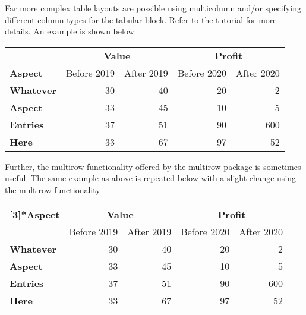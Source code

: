 Far more complex table layouts are possible using {\ttfamily multicolumn}
and/or specifying different column types for the {\ttfamily tabular} block.
Refer to the tutorial for more details. An example is shown below:

\begin{table}
\centering
{}
\begin{tabular}{>{\bfseries}p{2cm} rrrr}
\toprule
& \multicolumn{2}{c}{\textbf{Value}}
& \multicolumn{2}{c}{\textbf{Profit}} \\
\cmidrule(lr){2-3} \cmidrule(lr){4-5}
  Aspect
& \multicolumn{1}{c}{Before 2019}
& \multicolumn{1}{c}{After 2019}
& \multicolumn{1}{c}{Before 2020}
& \multicolumn{1}{c}{After 2020}      \\
\midrule
  Whatever
& 30
& 40
& 20
& 2       \\
  Aspect
& 33
& 45
& 10
& 5       \\
  Entries
& 37
& 51
& 90
& 600     \\
  Here
& 33
& 67
& 97
& 52      \\
\bottomrule
\end{tabular}
\end{table}

Further, the {\ttfamily multirow} functionality offered by the {\ttfamily
 multirow} package is sometimes useful. The same example as above is repeated
below with a slight change using the {\ttfamily multirow} functionality

\begin{table}
\centering
{}
\begin{tabular}{>{\bfseries}p{2cm} rrrr}
\toprule
  \multirow{2}[3]{*}{Aspect}
& \multicolumn{2}{c}{\textbf{Value}}
& \multicolumn{2}{c}{\textbf{Profit}} \\
\cmidrule(lr){2-3} \cmidrule(lr){4-5}
& \multicolumn{1}{c}{Before 2019}
& \multicolumn{1}{c}{After 2019}
& \multicolumn{1}{c}{Before 2020}
& \multicolumn{1}{c}{After 2020}      \\
\midrule
  Whatever
& 30
& 40
& 20
& 2       \\
  Aspect
& 33
& 45
& 10
& 5       \\
  Entries
& 37
& 51
& 90
& 600     \\
  Here
& 33
& 67
& 97
& 52      \\
\bottomrule
\end{tabular}
\end{table}


